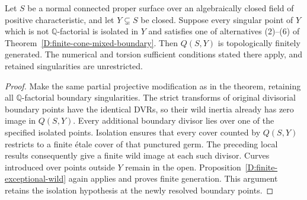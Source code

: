 \begin{corollary}
\label{D:finite-cone-fixed-boundary}
Let $S$ be a normal connected proper surface over an
algebraically closed field of positive characteristic, and
let $Y\subsetneq S$ be closed.  Suppose every singular point
of $Y$ which is not $\mathbb Q$-factorial is isolated in $Y$
and satisfies one of alternatives (2)--(6) of
Theorem~\ref{D:finite-cone-mixed-boundary}.  Then $Q(S,Y)$ is
topologically finitely generated.  The numerical and torsion
sufficient conditions stated there apply, and retained
singularities are unrestricted.
\end{corollary}
\begin{proof}
Make the same partial projective modification as in the theorem,
retaining all $\mathbb Q$-factorial boundary singularities.
The strict transforms of original divisorial boundary points
have the identical DVRs, so their wild inertia already has
zero image in $Q(S,Y)$.  Every additional boundary divisor
lies over one of the specified isolated points.  Isolation
ensures that every cover counted by $Q(S,Y)$ restricts to a
finite \'etale cover of that punctured germ.  The preceding
local results consequently give a finite wild image at each
such divisor.  Curves introduced over points outside $Y$
remain in the open.  Proposition~\ref{D:finite-exceptional-wild}
again applies and proves finite generation.  This argument
retains the isolation hypothesis at the newly resolved
boundary points.
\end{proof}
